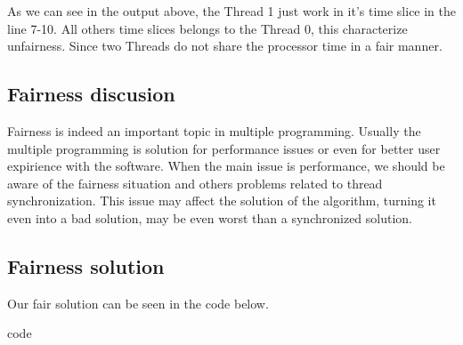 \documentclass{article}
\begin{document}
As we can see in the output above, the Thread 1 just work in it's time slice in the line 7-10. All
others time slices belongs to the Thread 0, this characterize unfairness. Since two Threads do not
share the processor time in a fair manner.

\subsection{Fairness discusion}

Fairness is indeed an important topic in multiple programming. Usually the multiple programming
is solution for performance issues or even for better user expirience with the software. 
When the main issue is performance, we should be aware of the fairness situation and others problems related
to thread synchronization. 
This issue may affect the solution of the algorithm, turning it even into a bad solution, may be even worst
than a synchronized solution.

\subsection{Fairness solution}

Our fair solution can be seen in the code below.

code
\end{document}

